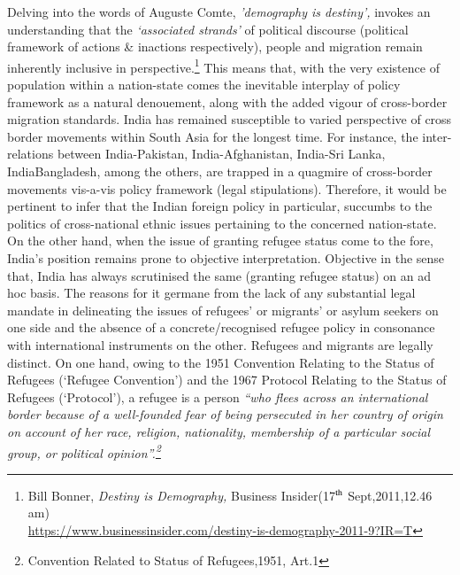 \setcounter{figure}{0}
\setcounter{table}{0}

\label{2019-art1}

\begin{multicols}{2}


\vspace{-.2cm}

\noi
Delving into the words of Auguste Comte, \textit{'demography is destiny',} invokes an
understanding that the \textit{‘associated strands’} of political discourse (political framework of
actions \& inactions respectively), people and migration remain inherently inclusive in
perspective.\footnote{Bill Bonner, \textit{Destiny is Demography,} Business Insider(17$^{\rm th}$ Sept,2011,12.46 am)\\
\url{https://www.businessinsider.com/destiny-is-demography-2011-9?IR=T}}  This means that, with the very existence of population within a nation-state
comes the inevitable interplay of policy framework as a natural denouement, along with the
added vigour of cross-border migration standards. India has remained susceptible to varied
perspective of cross border movements within South Asia for the longest time. For instance,
the inter-relations between India-Pakistan, India-Afghanistan, India-Sri Lanka, IndiaBangladesh, among the others, are trapped in a quagmire of cross-border movements vis-a-vis
policy framework (legal stipulations). Therefore, it would be pertinent to infer that the Indian
foreign policy in particular, succumbs to the politics of cross-national ethnic issues pertaining
to the concerned nation-state. On the other hand, when the issue of granting refugee status
come to the fore, India’s position remains prone to objective interpretation. Objective in the
sense that, India has always scrutinised the same (granting refugee status) on an ad hoc basis.
The reasons for it germane from the lack of any substantial legal mandate in delineating the
issues of refugees’ or migrants’ or asylum seekers on one side and the absence of a
concrete/recognised refugee policy in consonance with international instruments on the other.
Refugees and migrants are legally distinct. On one hand, owing to the 1951 Convention
Relating to the Status of Refugees (‘Refugee Convention’) and the 1967 Protocol Relating to
the Status of Refugees (‘Protocol’), a refugee is a person \textit{“who flees across an international
border because of a well-founded fear of being persecuted in her country of origin on account
of her race, religion, nationality, membership of a particular social group, or political
opinion”.\footnote{Convention Related to Status of Refugees,1951, Art.1}}


\end{multicols}
